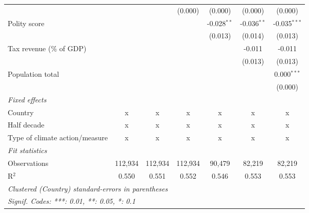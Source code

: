 \begin{tabular}{lcccccc}
                                                                               &              &                & (0.000)        & (0.000)        & (0.000)        & (0.000)\\   
   Polity score                                                                &              &                &                & -0.028$^{**}$  & -0.036$^{**}$  & -0.035$^{***}$\\   
                                                                               &              &                &                & (0.013)        & (0.014)        & (0.013)\\   
   Tax revenue (\% of GDP)                                                     &              &                &                &                & -0.011         & -0.011\\   
                                                                               &              &                &                &                & (0.013)        & (0.013)\\   
   Population total                                                            &              &                &                &                &                & 0.000$^{***}$\\   
                                                                               &              &                &                &                &                & (0.000)\\   
   \emph{Fixed effects}\\
   Country                                                                     & x            & x              & x              & x              & x              & x\\  
   Half decade                                                                 & x            & x              & x              & x              & x              & x\\  
   Type of climate action/measure                                              & x            & x              & x              & x              & x              & x\\  
   \midrule \emph{Fit statistics}\\
   Observations                                                                & 112,934      & 112,934        & 112,934        & 90,479         & 82,219         & 82,219\\  
   R$^2$                                                                       & 0.550        & 0.551          & 0.552          & 0.546          & 0.553          & 0.553\\  
   \midrule
   \multicolumn{7}{l}{\emph{Clustered (Country) standard-errors in parentheses}}\\
   \multicolumn{7}{l}{\emph{Signif. Codes: ***: 0.01, **: 0.05, *: 0.1}}\\
\end{tabular}
\par\endgroup


